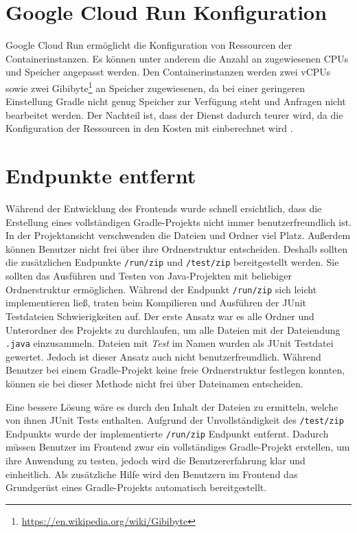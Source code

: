\section{Google Cloud Run Konfiguration}
Google Cloud Run ermöglicht die Konfiguration von Ressourcen der
Containerinstanzen. Es können unter anderem die Anzahl an zugewiesenen CPUs \cite{CloudRunCpuAlloc} und
Speicher \cite{CloudRunMemLimits} angepasst werden.
Den Containerinstanzen werden zwei vCPUs sowie zwei Gibibyte\footnote{\url{https://en.wikipedia.org/wiki/Gibibyte}}
an Speicher zugewiesenen, da bei einer geringeren Einstellung Gradle
nicht genug Speicher zur Verfügung steht und Anfragen nicht bearbeitet werden.
Der Nachteil ist, dass der Dienst dadurch teurer wird,
da die Konfiguration der Ressourcen in den Kosten mit einberechnet wird \cite{CloudRunPricing}.

\section{Endpunkte entfernt}
Während der Entwicklung des Frontends wurde schnell ersichtlich,
dass die Erstellung eines vollständigen Gradle-Projekts nicht immer benutzerfreundlich ist.
In der Projektansicht verschwenden die Dateien und Ordner viel Platz.
Außerdem können Benutzer nicht frei über ihre Ordnerstruktur entscheiden.
Deshalb sollten die zusätzlichen Endpunkte \texttt{/run/zip} und \texttt{/test/zip}
bereitgestellt werden. Sie sollten das Ausführen und Testen von Java-Projekten mit
beliebiger Ordnerstruktur ermöglichen.
Während der Endpunkt \texttt{/run/zip} sich leicht implementieren ließ, traten
beim Kompilieren und Ausführen der JUnit Testdateien Schwierigkeiten auf.
Der erste Ansatz war es alle Ordner und Unterordner des Projekts zu
durchlaufen, um alle Dateien mit der Dateiendung \texttt{.java} einzusammeln.
Dateien mit \emph{Test} im Namen wurden als JUnit Testdatei gewertet. Jedoch
ist dieser Ansatz auch nicht benutzerfreundlich. Während Benutzer
bei einem Gradle-Projekt keine freie Ordnerstruktur festlegen konnten,
können sie bei dieser Methode nicht frei über Dateinamen entscheiden.

Eine bessere Lösung wäre es durch den Inhalt der Dateien zu ermitteln,
welche von ihnen JUnit Tests enthalten. Aufgrund der Unvollständigkeit
des \texttt{/test/zip} Endpunkts wurde der implementierte
\texttt{/run/zip} Endpunkt entfernt. Dadurch müssen Benutzer im
Frontend zwar ein vollständiges Gradle-Projekt erstellen,
um ihre Anwendung zu testen,
jedoch wird die Benutzererfahrung klar und einheitlich.
Als zusätzliche Hilfe wird den Benutzern im Frontend das Grundgerüst eines Gradle-Projekts
automatisch bereitgestellt.

